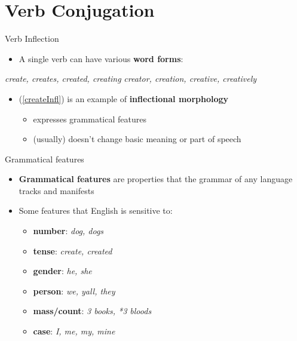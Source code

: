 \documentclass[10pt, compress]{beamer}
\begin{document}
\section{Verb Conjugation}
\begin{frame}{Verb Inflection}
	\begin{itemize}
		\item A single verb can have various {\bf word forms}:
	\end{itemize}

	\begin{exe}
			\begin{xlist}
			\ex\label{createInfl} \emph{create, creates, created, creating}
			\ex\label{createDer} \emph{creator, creation, creative, creatively}
		\end{xlist}
	\end{exe}

	\begin{itemize}
		\item (\ref{createInfl}) is an example of {\bf inflectional morphology}
		\begin{itemize}
			\item expresses grammatical features
			\item (usually) doesn't change basic meaning or part of speech
		\end{itemize}
	\end{itemize}
\end{frame}

\begin{frame}{Grammatical features}
	\begin{itemize}
		\item \textbf{Grammatical features} are properties that the grammar of any language tracks and manifests
		\item Some features that English is sensitive to:
		\begin{itemize}
			\item \textbf{number}: \emph{dog, dogs}
			\item \textbf{tense}: \emph{create, created}
			\item \textbf{gender}: \emph{he, she}
			\item \textbf{person}: \emph{we, yall, they}
			\item \textbf{mass/count}: \emph{3 books, *3 bloods}
			\item \textbf{case}: \emph{I, me, my, mine}
		\end{itemize}
	\end{itemize}
\end{frame}
\end{document}
